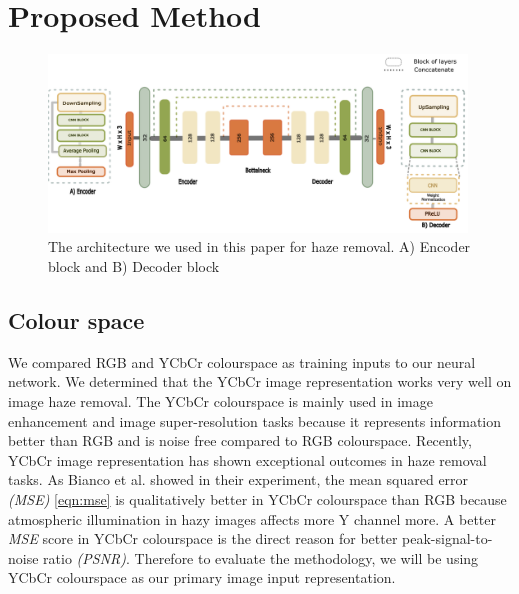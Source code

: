 \section{Proposed Method}
\label{proposed_method}

 \begin{figure}[ht]
    \centering
    \includegraphics[height=0.5\textwidth, width=0.99\textwidth]{images/i4c_haze.png}
    \caption{The architecture we used in this paper for haze removal. A) Encoder block and B) Decoder block}
    \label{fig:haze_removal_model}
\end{figure}
\subsection{Colour space}\label{color_space}
We compared RGB and YCbCr colourspace as training inputs to our neural network. We determined that the YCbCr image representation works very well on image haze removal. The YCbCr colourspace is mainly used in image enhancement and image super-resolution tasks because it represents information better than RGB and is noise free compared to RGB colourspace. Recently, YCbCr image representation has shown exceptional outcomes in haze removal tasks. 
As Bianco et al. \cite{hr_haze} showed in their experiment, the mean squared error \textit{(MSE)} \eqref{eqn:mse} is qualitatively better in YCbCr colourspace than RGB because atmospheric illumination in hazy images affects more Y channel more. A better \textit{MSE}  score in YCbCr colourspace is the direct reason for better peak-signal-to-noise ratio \textit{(PSNR)}. Therefore to evaluate the methodology, we will be using YCbCr colourspace as our primary image input representation.
